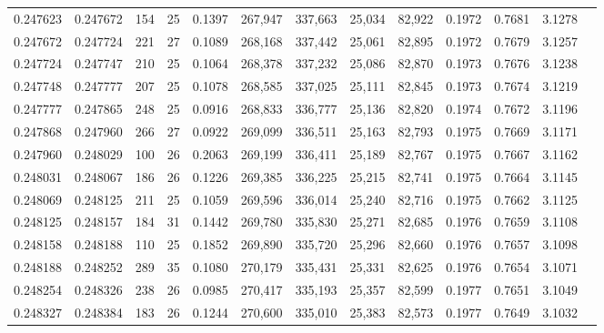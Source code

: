 \begin{tabular}{rrrrrrrrrrrrr}
0.247623 & 0.247672 &   154 &  25 &                                     0.1397 & 267,947 & 337,663 &  25,034 &  82,922 & 0.1972 & 0.7681 & 3.1278 \\
0.247672 & 0.247724 &   221 &  27 &                                     0.1089 & 268,168 & 337,442 &  25,061 &  82,895 & 0.1972 & 0.7679 & 3.1257 \\
0.247724 & 0.247747 &   210 &  25 &                                     0.1064 & 268,378 & 337,232 &  25,086 &  82,870 & 0.1973 & 0.7676 & 3.1238 \\
0.247748 & 0.247777 &   207 &  25 &                                     0.1078 & 268,585 & 337,025 &  25,111 &  82,845 & 0.1973 & 0.7674 & 3.1219 \\
0.247777 & 0.247865 &   248 &  25 &                                     0.0916 & 268,833 & 336,777 &  25,136 &  82,820 & 0.1974 & 0.7672 & 3.1196 \\
0.247868 & 0.247960 &   266 &  27 &                                     0.0922 & 269,099 & 336,511 &  25,163 &  82,793 & 0.1975 & 0.7669 & 3.1171 \\
0.247960 & 0.248029 &   100 &  26 &                                     0.2063 & 269,199 & 336,411 &  25,189 &  82,767 & 0.1975 & 0.7667 & 3.1162 \\
0.248031 & 0.248067 &   186 &  26 &                                     0.1226 & 269,385 & 336,225 &  25,215 &  82,741 & 0.1975 & 0.7664 & 3.1145 \\
0.248069 & 0.248125 &   211 &  25 &                                     0.1059 & 269,596 & 336,014 &  25,240 &  82,716 & 0.1975 & 0.7662 & 3.1125 \\
0.248125 & 0.248157 &   184 &  31 &                                     0.1442 & 269,780 & 335,830 &  25,271 &  82,685 & 0.1976 & 0.7659 & 3.1108 \\
0.248158 & 0.248188 &   110 &  25 &                                     0.1852 & 269,890 & 335,720 &  25,296 &  82,660 & 0.1976 & 0.7657 & 3.1098 \\
0.248188 & 0.248252 &   289 &  35 &                                     0.1080 & 270,179 & 335,431 &  25,331 &  82,625 & 0.1976 & 0.7654 & 3.1071 \\
0.248254 & 0.248326 &   238 &  26 &                                     0.0985 & 270,417 & 335,193 &  25,357 &  82,599 & 0.1977 & 0.7651 & 3.1049 \\
0.248327 & 0.248384 &   183 &  26 &                                     0.1244 & 270,600 & 335,010 &  25,383 &  82,573 & 0.1977 & 0.7649 & 3.1032 \\

\end{tabular}

